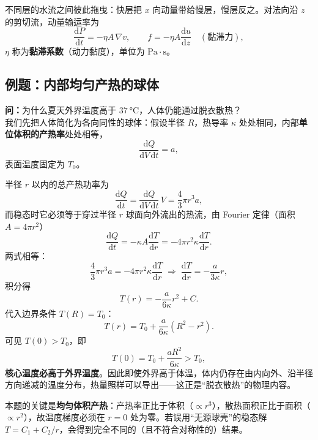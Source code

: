 \documentclass[11pt,a4paper,openany]{ctexbook}
\newcommand{\dd}{\mathrm d}
\begin{document}
不同层的水流之间彼此拖曳：快层把 $x$ 向动量带给慢层，慢层反之。对法向沿 $z$ 的剪切流，动量输运率为
\[
\boxed{\frac{\dd P}{\dd t}=-\eta A\,\nabla v},
\qquad
f=-\eta A\frac{\dd u}{\dd z}\quad(\text{黏滞力}),
\]
$\eta$ 称为\textbf{黏滞系数}（动力黏度），单位为 $\mathrm{Pa\cdot s}$。

\subsection*{例题：内部均匀产热的球体}

\textbf{问：}为什么夏天外界温度高于 $\SI{37}{\celsius}$，人体仍能通过脱衣散热？\\
我们先把人体简化为各向同性的球体：假设半径 $R$，热导率 $\kappa$ 处处相同，内部\textbf{单位体积的产热率}处处相等，
\[
\frac{\dd Q}{\dd V\,\dd t}=a,
\]
表面温度固定为 $T_0$。

\begin{center}
\end{center}

半径 $r$ 以内的总产热功率为
\[
\frac{\dd Q}{\dd t}=\frac{\dd Q}{\dd V\,\dd t}\,V=\frac43\pi r^3 a,
\]
而稳态时它必须等于穿过半径 $r$ 球面向外流出的热流，由 Fourier 定律（面积 $A=4\pi r^2$）
\[
\frac{\dd Q}{\dd t}=-\kappa A\frac{\dd T}{\dd r}=-4\pi r^2\kappa\frac{\dd T}{\dd r}.
\]
两式相等：
\[
\frac43\pi r^3a=-4\pi r^2\kappa\frac{\dd T}{\dd r}
\;\Longrightarrow\;
\frac{\dd T}{\dd r}=-\frac{a}{3\kappa}r,
\]
积分得
\[
T(r)=-\frac{a}{6\kappa}r^2+C .
\]
代入边界条件 $T(R)=T_0$：
\[
\boxed{T(r)=T_0+\frac{a}{6\kappa}\left(R^2-r^2\right)}.
\]
可见 \(T(0)>T_0\)，即
\[
T(0)=T_0+\frac{aR^2}{6\kappa}>T_0,
\]
\textbf{核心温度必高于外界温度}。因此即使外界高于体温，体内仍存在由内向外、沿半径方向递减的温度分布，热量照样可以导出——这正是“脱衣散热”的物理内容。

\begin{notebox}
本题的关键是\textbf{均匀体积产热}：产热率正比于体积（$\propto r^3$），散热面积正比于面积（$\propto r^2$），故温度梯度必须在 $r=0$ 处为零。若误用“无源球壳”的稳态解 $T=C_1+C_2/r$，会得到完全不同的（且不符合对称性的）结果。
\end{notebox}
\end{document}

